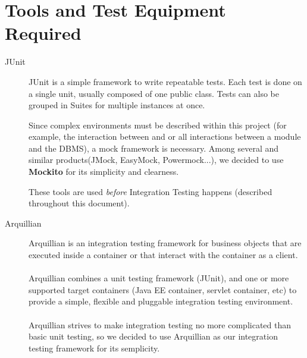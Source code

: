 \documentclass[a4paper, 12pt]{article}
\newcounter{tc}
\begin{document}


\newpage
\section{Tools and Test Equipment Required}
\label{sub:tools_and_test_equipment_required}

\begin{description}
    \item[JUnit] JUnit is a simple framework to write repeatable tests. Each test is done on a single unit, usually composed of one public class. Tests can also be grouped in Suites for multiple instances at once.

    Since complex environments must be described within this project (for example, the interaction between  and  or all interactions between a module and the DBMS), a mock framework is necessary. Among several and similar products(JMock, EasyMock, Powermock...), we decided to use \textbf{Mockito} for its simplicity and clearness.

    These tools are used \emph{before} Integration Testing happens (described throughout this document).

    \item[Arquillian] Arquillian is an integration testing framework for business objects that are executed inside a container or that interact with the container as a client. \\
\\
Arquillian combines a unit testing framework (JUnit), and one or more supported target containers (Java EE container, servlet container, etc) to provide a simple, flexible and pluggable integration testing environment. \\ \\
Arquillian strives to make integration testing no more complicated than basic unit testing, so we decided to use Arquillian as our integration testing framework for its semplicity.


\end{description}
\end{document}
